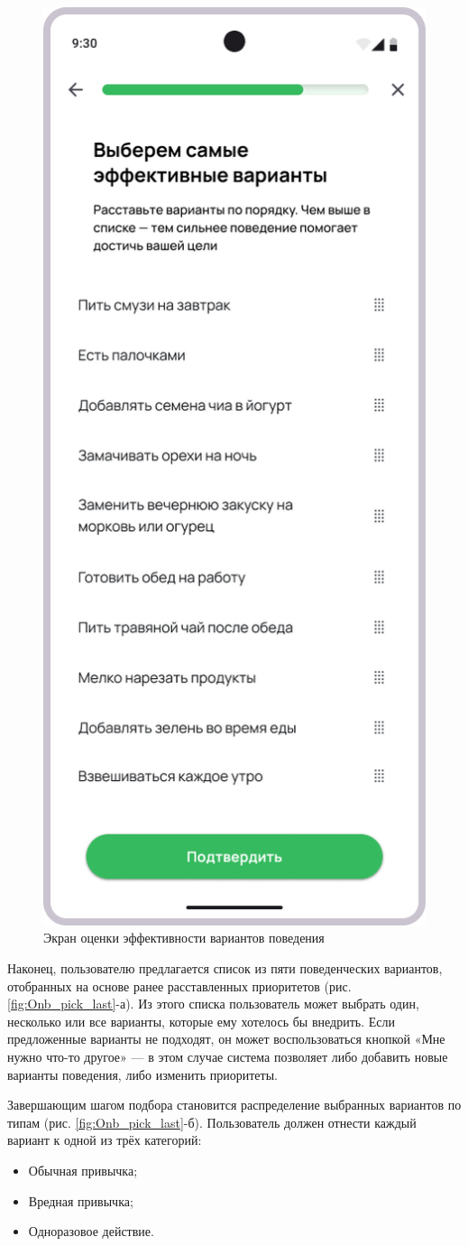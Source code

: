 \documentclass[pdflatex,sn-mathphys-num]{sn-jnl}%
\theoremstyle{thmstyleone}%
\theoremstyle{thmstyletwo}%
\theoremstyle{thmstylethree}%
\begin{document}
\begin{figure}
    \centering
    \includegraphics[width=0.5\linewidth]{figures/App/Onb_pick_4.png}
    \caption{Экран оценки эффективности вариантов поведения}
    \label{fig:Onb_pick_4}
\end{figure}

Наконец, пользователю предлагается список из пяти поведенческих вариантов, отобранных на основе ранее расставленных приоритетов (рис. \ref{fig:Onb_pick_last}-а). Из этого списка пользователь может выбрать один, несколько или все варианты, которые ему хотелось бы внедрить. Если предложенные варианты не подходят, он может воспользоваться кнопкой «Мне нужно что-то другое» — в этом случае система позволяет либо добавить новые варианты поведения, либо изменить приоритеты.

Завершающим шагом подбора становится распределение выбранных вариантов по типам (рис. \ref{fig:Onb_pick_last}-б). Пользователь должен отнести каждый вариант к одной из трёх категорий:

\begin{itemize}
    \item Обычная привычка;
    \item Вредная привычка;
    \item Одноразовое действие.
\end{itemize}
\end{document}
